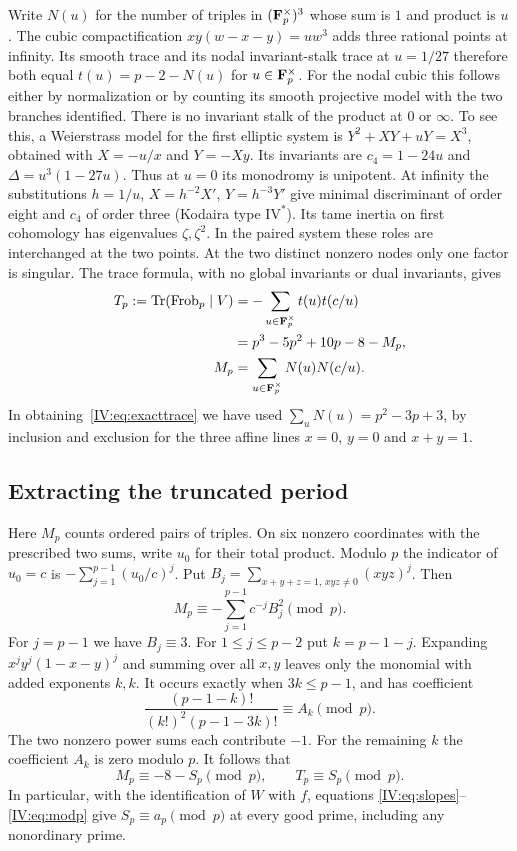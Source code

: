 \documentclass[11pt,letterpaper]{article}
\theoremstyle{definition}
\theoremstyle{remark}
\begin{document}
Write $N(u)$ for the number of triples in $(\mathbf F_p^\times)^3$ whose
sum is $1$ and product is $u$. The cubic compactification
$x y(w-x-y)=u w^3$ adds three rational points at infinity. Its smooth
trace and its nodal invariant-stalk trace at $u=1/27$ therefore both
equal $t(u)=p-2-N(u)$ for $u\in\mathbf F_p^\times$. For the nodal cubic
this follows either by normalization or by counting its smooth
projective model with the two branches identified.
There is no invariant stalk of the product at $0$ or $\infty$.
To see this, a Weierstrass model for the first elliptic system is
$Y^2+XY+uY=X^3$, obtained with $X=-u/x$ and $Y=-Xy$. Its invariants
are $c_4=1-24u$ and $\Delta=u^3(1-27u)$. Thus at $u=0$ its
monodromy is unipotent. At infinity the substitutions $h=1/u$,
$X=h^{-2}X'$, $Y=h^{-3}Y'$ give minimal discriminant of order eight
and $c_4$ of order three (Kodaira type $\mathrm{IV}^*$). Its tame
inertia on first cohomology has eigenvalues $\zeta,\zeta^2$. In the
paired system these roles are interchanged at the two points.
At the two distinct nonzero nodes only one factor is singular.
The trace formula, with no global invariants or dual invariants, gives
\begin{align}
 T_p:=\operatorname{Tr}(\operatorname{Frob}_p\mid V)
   &=-\sum_{u\in\mathbf F_p^\times}t(u)t(c/u) \notag\\
   &=p^3-5p^2+10p-8-M_p,\label{IV:eq:exacttrace}\\
 M_p&=\sum_{u\in\mathbf F_p^\times}N(u)N(c/u).\notag
\end{align}
In obtaining~\eqref{IV:eq:exacttrace} we have used
$\sum_uN(u)=p^2-3p+3$, by inclusion and exclusion for the three
affine lines $x=0$, $y=0$ and $x+y=1$.

\subsection{Extracting the truncated period}
Here $M_p$ counts ordered pairs of triples. On six nonzero
coordinates with the prescribed two sums, write $u_0$ for their total
product. Modulo $p$ the indicator of $u_0=c$ is
$-\sum_{j=1}^{p-1}(u_0/c)^j$. Put
$B_j=\sum_{x+y+z=1,\,xyz\ne0}(xyz)^j$. Then
\[
 M_p\equiv-\sum_{j=1}^{p-1}c^{-j}B_j^2\pmod p.
\]
For $j=p-1$ we have $B_j\equiv3$. For $1\leq j\leq p-2$ put
$k=p-1-j$. Expanding $x^jy^j(1-x-y)^j$ and summing over all $x,y$
leaves only the monomial with added exponents $k,k$. It occurs exactly
when $3k\leq p-1$, and has coefficient
\[
 \frac{(p-1-k)!}{(k!)^2(p-1-3k)!}\equiv A_k\pmod p .
\]
The two nonzero power sums each contribute $-1$. For the remaining
$k$ the coefficient $A_k$ is zero modulo $p$. It follows that
\begin{equation}\label{IV:eq:modp}
 M_p\equiv -8-S_p\pmod p,\qquad T_p\equiv S_p\pmod p .
\end{equation}
In particular, with the identification of $W$ with $f$, equations
\eqref{IV:eq:slopes}--\eqref{IV:eq:modp} give $S_p\equiv a_p\pmod p$
at every good prime, including any nonordinary prime.
\end{document}
